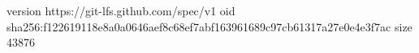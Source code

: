 version https://git-lfs.github.com/spec/v1
oid sha256:f122619118e8a0a0646aef8c68ef7abf163961689c97cb61317a27e0e4e3f7ac
size 43876
